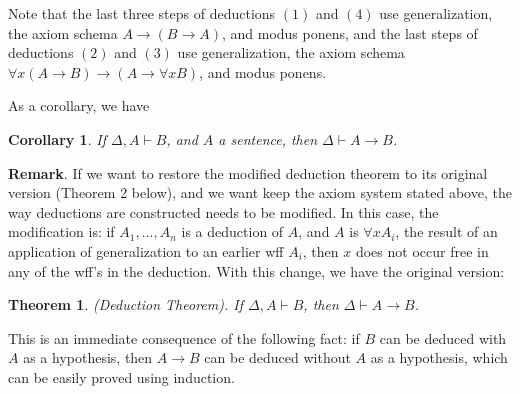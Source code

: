 \documentclass[12pt]{article}
\newtheorem{thm}{Theorem}
\newtheorem{cor}{Corollary}
\begin{document}
Note that the last three steps of deductions $(1)$ and $(4)$ use generalization, the axiom schema $A\to (B\to A)$, and modus ponens, and the last steps of deductions $(2)$ and $(3)$ use generalization, the axiom schema $\forall x (A\to B) \to (A \to \forall x B)$, and modus ponens.

As a corollary, we have

\begin{cor} If $\Delta, A \vdash B$, and $A$ a sentence, then $\Delta \vdash A \to B$. \end{cor}

\textbf{Remark}.  If we want to restore the modified deduction theorem to its original version (Theorem 2 below), and we want keep the axiom system stated above, the way deductions are constructed needs to be modified.  In this case, the modification is: if $A_1,\ldots,A_n$ is a deduction of $A$, and $A$ is $\forall x A_i$, the result of an application of generalization to an earlier wff $A_i$, then $x$ does not occur free in any of the wff's in the deduction.  With this change, we have the original version:

\begin{thm} (Deduction Theorem).  If $\Delta, A \vdash B$, then $\Delta \vdash A\to B$. \end{thm}

This is an immediate consequence of the following fact: if $B$ can be deduced with $A$ as a hypothesis, then $A\to B$ can be deduced without $A$ as a hypothesis, which can be easily proved using induction.

\end{document}
